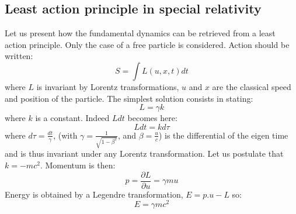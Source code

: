 \documentclass[12pt]{book}
\begin{document}
\subsection{Least action principle in special relativity}
Let us present how the fundamental dynamics can be retrieved from a
least action principle. Only the case of a free particle is
considered.
Action should be written:
\begin{equation}
S=\int L(u,x,t) dt
\end{equation}
where $L$ is invariant by Lorentz transformations, $u$ and $x$ are the
classical speed and position of the particle. The simplest
solution consists in stating:
\begin{equation}
L=\gamma k
\end{equation}
where $k$ is a constant. Indeed $Ldt$ becomes here:
\begin{equation}
Ldt=k d\tau
\end{equation}
where $d\tau=\frac{dt}{\gamma}$, 
(with $\gamma=\frac{1}{\sqrt{1-\beta^2}}$, and 
$\beta=\frac{u}{c}$) is the differential of the
eigen time and is thus 
invariant under any Lorentz transformation. Let us postulate that $k=-mc^2$.
Momentum is then:
\begin{equation}
p=\frac{\partial L}{\partial u}=\gamma m u
\end{equation}
Energy is obtained by a Legendre transformation, $E=p.u-L$ so:
\begin{equation}
E=\gamma m c^2
\end{equation}
\end{document}

